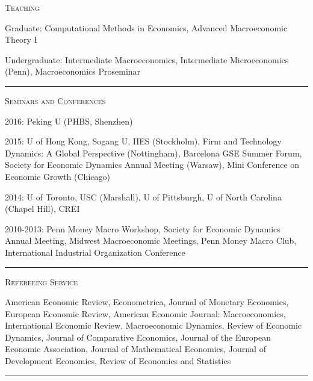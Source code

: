 \documentclass{article}
\begin{document}
\parbox{\textwidth}{
\parbox[t]{0.28\textwidth}{ \raggedright \noindent \textsc{ Teaching } }
\parbox[t]{0.72\textwidth}{ \raggedright

Graduate: Computational Methods in Economics, Advanced Macroeconomic Theory I
\vspace{0.27cm}

Undergraduate: Intermediate Macroeconomics, Intermediate Microeconomics (Penn), Macroeconomics Proseminar
\vspace{0.27cm}

}
\textcolor{light-gray}{\hrule}
}
\vspace{0.3cm}

\parbox{\textwidth}{
\parbox[t]{0.28\textwidth}{ \raggedright \noindent \textsc{ Seminars and Conferences } }
\parbox[t]{0.72\textwidth}{ \raggedright

2016: Peking U (PHBS, Shenzhen)
\vspace{0.27cm}

2015: U of Hong Kong, Sogang U, IIES (Stockholm), Firm and Technology Dynamics: A Global Perspective (Nottingham), Barcelona GSE Summer Forum, Society for Economic Dynamics Annual Meeting (Warsaw), Mini Conference on Economic Growth (Chicago)
\vspace{0.27cm}

2014: U of Toronto, USC (Marshall), U of Pittsburgh, U of North Carolina (Chapel Hill), CREI
\vspace{0.27cm}

2010-2013: Penn Money Macro Workshop, Society for Economic Dynamics Annual Meeting, Midwest Macroeconomic Meetings, Penn Money Macro Club, International Industrial Organization Conference
\vspace{0.27cm}

}
\textcolor{light-gray}{\hrule}
}
\vspace{0.3cm}

\parbox{\textwidth}{
\parbox[t]{0.28\textwidth}{ \raggedright \noindent \textsc{ Refereeing Service } }
\parbox[t]{0.72\textwidth}{ \raggedright

American Economic Review, Econometrica, Journal of Monetary Economics, European Economic Review, American Economic Journal: Macroeconomics, International Economic Review, Macroeconomic Dynamics, Review of Economic Dynamics, Journal of Comparative Economics, Journal of the European Economic Association, Journal of Mathematical Economics, Journal of Development Economics, Review of Economics and Statistics
\vspace{0.27cm}

}
\textcolor{light-gray}{\hrule}
}
\vspace{0.3cm}
\end{document}
